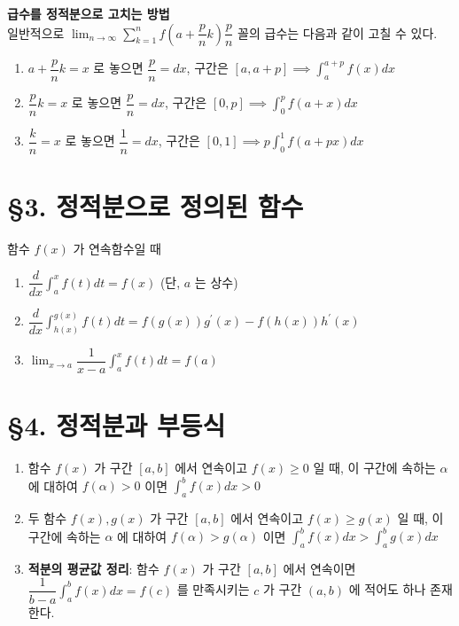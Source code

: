 \documentclass[a4paper,11pt]{article}
\begin{document}
\begin{advicebox}
\textbf{급수를 정적분으로 고치는 방법} \\
일반적으로 $\displaystyle \lim_{n \to \infty} \sum_{k=1}^{n} f\left(a + \dfrac{p}{n}k\right) \dfrac{p}{n}$ 꼴의 급수는 다음과 같이 고칠 수 있다.
\begin{enumerate}[label=\text{\arabic*°}]
    \item $a + \dfrac{p}{n}k = x$ 로 놓으면 $\dfrac{p}{n} = dx$, 구간은 $[a, a+p] \implies \displaystyle \int_{a}^{a+p} f(x) dx$
    \item $\dfrac{p}{n}k = x$ 로 놓으면 $\dfrac{p}{n} = dx$, 구간은 $[0, p] \implies \displaystyle \int_{0}^{p} f(a+x) dx$
    \item $\dfrac{k}{n} = x$ 로 놓으면 $\dfrac{1}{n} = dx$, 구간은 $[0, 1] \implies \displaystyle p \int_{0}^{1} f(a+px) dx$
\end{enumerate}
\end{advicebox}

\section*{§3. 정적분으로 정의된 함수}

\begin{conceptbox}[기본 정석]
함수 $f(x)$ 가 연속함수일 때 
\begin{enumerate}
    \item $\displaystyle \dfrac{d}{dx} \int_{a}^{x} f(t) dt = f(x)$ (단, $a$ 는 상수) 
    \item $\displaystyle \dfrac{d}{dx} \int_{h(x)}^{g(x)} f(t) dt = f(g(x))g^{\prime}(x) - f(h(x))h^{\prime}(x)$ 
    \item $\displaystyle \lim_{x \to a} \dfrac{1}{x-a} \int_{a}^{x} f(t) dt = f(a)$ 
\end{enumerate}
\end{conceptbox}


\section*{§4. 정적분과 부등식}

\begin{conceptbox}[기본 정석]
\begin{enumerate}
    \item 함수 $f(x)$ 가 구간 $[a, b]$ 에서 연속이고 $f(x) \ge 0$ 일 때, 이 구간에 속하는 $\alpha$ 에 대하여 $f(\alpha) > 0$ 이면 $\displaystyle \int_{a}^{b} f(x) dx > 0$ 
    \item 두 함수 $f(x), g(x)$ 가 구간 $[a, b]$ 에서 연속이고 $f(x) \ge g(x)$ 일 때, 이 구간에 속하는 $\alpha$ 에 대하여 $f(\alpha) > g(\alpha)$ 이면 $\displaystyle \int_{a}^{b} f(x) dx > \int_{a}^{b} g(x) dx$ 
    \item \textbf{적분의 평균값 정리}: 함수 $f(x)$ 가 구간 $[a, b]$ 에서 연속이면 $\displaystyle \dfrac{1}{b-a} \int_{a}^{b} f(x) dx = f(c)$ 를 만족시키는 $c$ 가 구간 $(a, b)$ 에 적어도 하나 존재한다. 
\end{enumerate}
\end{conceptbox}
\end{document}
